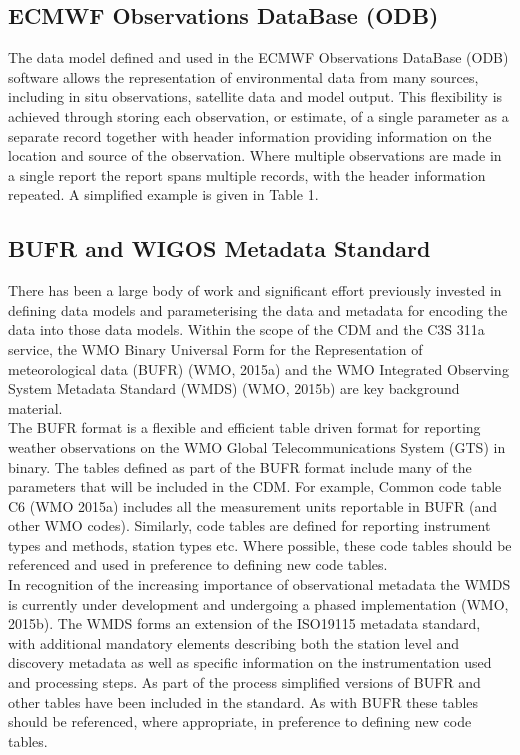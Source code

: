 \documentclass[a4paper]{article}
\begin{document}
\subsection{ECMWF Observations DataBase (ODB)}

The data model defined and used in the ECMWF Observations DataBase (ODB) software allows the representation of environmental data from many sources, including in situ observations, satellite data and model output. This flexibility is achieved through storing each observation, or estimate, of a single parameter as a separate record together with header information providing information on the location and source of the observation. Where multiple observations are made in a single report the report spans multiple records, with the header information repeated. A simplified example is given in Table 1.\\



\subsection {BUFR and WIGOS Metadata Standard}
There has been a large body of work and significant effort previously invested in defining data models and parameterising the data and metadata for encoding the data into those data models.  Within the scope of the CDM and the C3S 311a service, the WMO Binary Universal Form for the Representation of meteorological data (BUFR) (WMO, 2015a) and the WMO Integrated Observing System Metadata Standard (WMDS) (WMO, 2015b) are key background material. \\

The BUFR format is a flexible and efficient table driven format for reporting weather observations on the WMO Global Telecommunications System (GTS) in binary. The tables defined as part of the BUFR format include many of the parameters that will be included in the CDM. For example, Common code table C6 (WMO 2015a) includes all the measurement units reportable in BUFR (and other WMO codes). Similarly, code tables are defined for reporting instrument types and methods, station types etc. Where possible, these code tables should be referenced and used in preference to defining new code tables.\\

In recognition of the increasing importance of observational metadata the WMDS is currently under development and undergoing a phased implementation (WMO, 2015b). The WMDS forms an extension of the ISO19115 metadata standard, with additional mandatory elements describing both the station level and discovery metadata as well as specific information on the instrumentation used and processing steps. As part of the process simplified versions of BUFR and other tables have been included in the standard. As with BUFR these tables should be referenced, where appropriate, in preference to defining new code tables. \\
\end{document}
